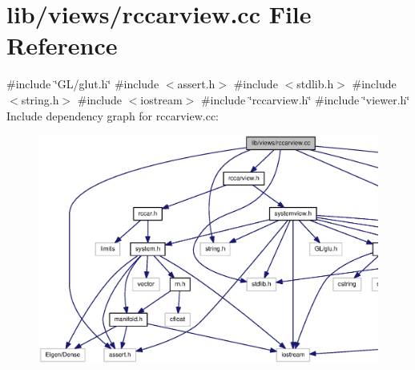 \section{lib/views/rccarview.cc \-File \-Reference}
\label{rccarview_8cc}
{\ttfamily \#include \char`\"{}\-G\-L/glut.\-h\char`\"{}}\*
{\ttfamily \#include $<$assert.\-h$>$}\*
{\ttfamily \#include $<$stdlib.\-h$>$}\*
{\ttfamily \#include $<$string.\-h$>$}\*
{\ttfamily \#include $<$iostream$>$}\*
{\ttfamily \#include \char`\"{}rccarview.\-h\char`\"{}}\*
{\ttfamily \#include \char`\"{}viewer.\-h\char`\"{}}\*
\-Include dependency graph for rccarview.\-cc\-:\nopagebreak
\begin{figure}[H]
\begin{center}
\leavevmode
\includegraphics[width=350pt]{rccarview_8cc__incl}
\end{center}
\end{figure}
